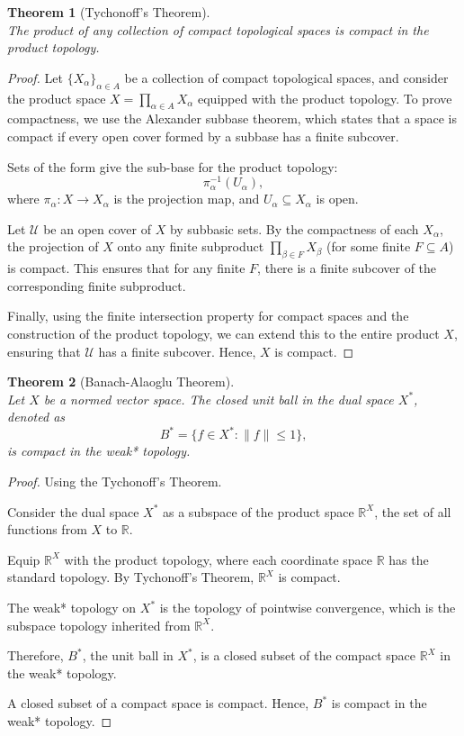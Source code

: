 \documentclass[12pt, reqno]{amsart}
\newtheorem{theorem}{Theorem}[section]
\theoremstyle{definition}
\numberwithin{equation}{section}
\newcommand{\dR}{{\mathbb R}}
\begin{document}
\begin{theorem}[Tychonoff's Theorem] \hfill \\
 The product of any collection of compact topological spaces is compact in the product topology.
\end{theorem}
\begin{proof}
Let \( \{X_\alpha\}_{\alpha \in A} \) be a collection of compact topological spaces, and consider the product space \( X = \prod_{\alpha \in A} X_\alpha \) equipped with the product topology. To prove compactness, we use the Alexander subbase theorem, which states that a space is compact if every open cover formed by a subbase has a finite subcover.

Sets of the form give the sub-base for the product topology:
\[
\pi_\alpha^{-1}(U_\alpha),
\]
where \( \pi_\alpha: X \to X_\alpha \) is the projection map, and \( U_\alpha \subseteq X_\alpha \) is open.

Let \( \mathcal{U} \) be an open cover of \( X \) by subbasic sets. By the compactness of each \( X_\alpha \), the projection of \( X \) onto any finite subproduct \( \prod_{\beta \in F} X_\beta \) (for some finite \( F \subseteq A \)) is compact. This ensures that for any finite \( F \), there is a finite subcover of the corresponding finite subproduct.

Finally, using the finite intersection property for compact spaces and the construction of the product topology, we can extend this to the entire product \( X \), ensuring that \( \mathcal{U} \) has a finite subcover. Hence, \( X \) is compact.
\end{proof}


\begin{theorem} [Banach-Alaoglu Theorem] \hfill \\
Let $X$ be a normed vector space. The closed unit ball in the dual space $X^*$, denoted as
\[
B^* = \{ f \in X^* : \| f \| \leq 1 \},
\]
is compact in the weak* topology.
\end{theorem}
\pagebreak
\begin{proof}
Using the Tychonoff's Theorem.

Consider the dual space $X^*$ as a subspace of the product space $\dR^X$, the set of all functions from $X$ to $\dR$.

Equip $\dR^X$ with the product topology, where each coordinate space $\dR$ has the standard topology. By Tychonoff's Theorem, $\dR^X$ is compact.

The weak* topology on $X^*$ is the topology of pointwise convergence, which is the subspace topology inherited from $\dR^X$.

Therefore, $B^*$, the unit ball in $X^*$, is a closed subset of the compact space $\dR^X$ in the weak* topology.

A closed subset of a compact space is compact. Hence, $B^*$ is compact in the weak* topology.
\end{proof}
\end{document}
